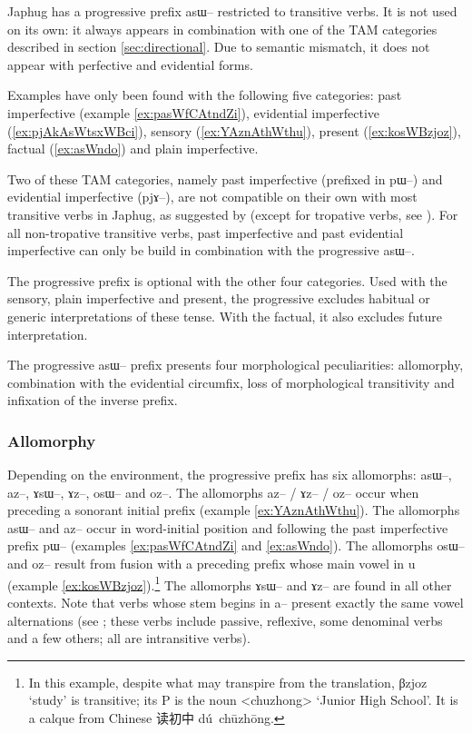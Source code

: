 \documentclass[oldfontcommands,oneside,a4paper,11pt]{article}
\newcommand{\ipa}[1]{{\phon \mbox{#1}}} %
\newcommand{\zh}[1]{{\cn #1}}
\begin{document}
Japhug has a progressive prefix \ipa{asɯ--} restricted to transitive verbs. It is not used on its own: it always appears in combination with one of the TAM categories described in section \ref{sec:directional}. Due to semantic mismatch, it does not appear with perfective and evidential forms.


Examples have only been found with the following five categories: past imperfective (example \ref{ex:pasWfCAtndZi}), evidential imperfective (\ref{ex:pjAkAsWtsxWBci}), sensory (\ref{ex:YAznAthWthu}), present (\ref{ex:kosWBzjoz}), factual (\ref{ex:asWndo}) and plain imperfective. 

Two of these TAM categories, namely past imperfective (prefixed in \ipa{pɯ--}) and evidential imperfective (\ipa{pjɤ--}), are not compatible on their own with most transitive verbs in Japhug, as suggested by \citet{lin11direction} (except for tropative verbs, see \citealt{jacques13tropative}). For all non-tropative transitive verbs, past imperfective and past evidential imperfective can only be build in combination with the progressive \ipa{asɯ--}. 

The progressive prefix is optional with the other four categories. Used with the sensory, plain imperfective and present, the progressive excludes habitual or generic interpretations of these tense. With the factual, it also excludes future interpretation.


The progressive \ipa{asɯ--} prefix presents four morphological peculiarities: allomorphy, combination with the evidential circumfix, loss of morphological transitivity and infixation of the inverse prefix.


\subsubsection{Allomorphy} \label{sec:prog.allomorphy}
Depending on the environment, the progressive prefix has six allomorphs: \ipa{asɯ--}, \ipa{az--}, \ipa{ɤsɯ--}, \ipa{ɤz--}, \ipa{osɯ--} and \ipa{oz--}. The allomorphs   \ipa{az--} / \ipa{ɤz--} / \ipa{oz--} occur when preceding a sonorant initial prefix (example \ref{ex:YAznAthWthu}). The allomorphs \ipa{asɯ--} and \ipa{az--} occur in word-initial position and following the past imperfective prefix \ipa{pɯ--} (examples \ref{ex:pasWfCAtndZi} and \ref{ex:asWndo}). The allomorphs \ipa{osɯ--} and \ipa{oz--} result from fusion with a preceding prefix whose main vowel in \ipa{u} (example \ref{ex:kosWBzjoz}).\footnote{In this example, despite what may transpire from the translation, \ipa{βzjoz} `study' is transitive; its P is the noun <chuzhong> `Junior High School'. It is a calque from Chinese \zh{读初中} \ipa{dú chūzhōng}.} The allomorphs \ipa{ɤsɯ--} and \ipa{ɤz--} are found in all other contexts. Note that verbs whose stem begins in \ipa{a--} present exactly the same vowel alternations (see \citealt{jacques07passif}; these verbs include passive, reflexive, some denominal verbs and a few others; all are intransitive verbs).
\end{document}
